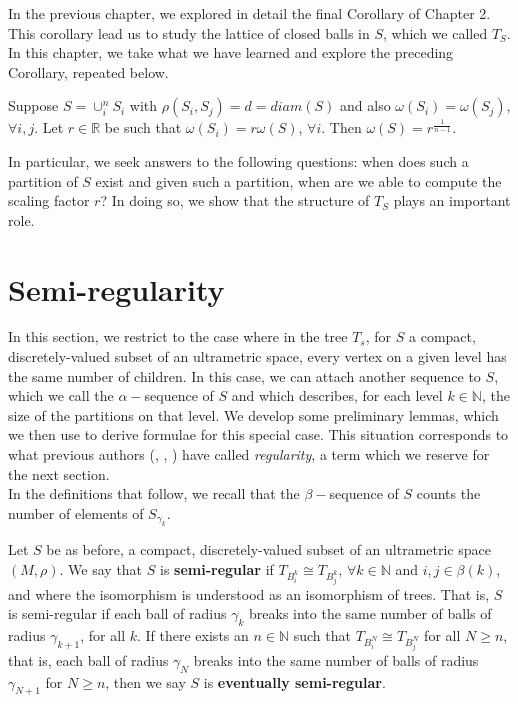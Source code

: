 In the previous chapter, we explored in detail the final Corollary of Chapter 2. This corollary lead us to study the lattice of closed balls in $S$, which we called $T_S$. In this chapter, we take what we have learned and explore the preceding Corollary, repeated below.\\

\begin{corollary*}
	Suppose $S = \cup_i^n S_i$ with $\rho(S_i, S_j)=d=diam(S)$ and also $\omega(S_i)=\omega(S_j)$, $\forall i,j$.  Let $r \in \mathbb{R}$ be such that $\omega(S_i)=r\omega(S)$, $\forall i$. Then $\omega(S) = r^{\frac{1}{n-1}}$. 
\end{corollary*}

In particular, we seek answers to the following questions: when does such a partition of $S$ exist and given such a partition, when are we able to compute the scaling factor $r$? In doing so, we show that the structure of $T_S$ plays an important role. 


\section{Semi-regularity}
In this section, we restrict to the case where in the tree $T_s$, for $S$ a compact, discretely-valued subset of an ultrametric space, every vertex on a given level has the same number of children. In this case, we can attach another sequence to $S$, which we call the $\alpha-$sequence of $S$ and which describes, for each level $k \in \mathbb{N}$, the size of the partitions on that level. We develop some preliminary lemmas, which we then use to derive formulae for this special case. This situation corresponds to what previous authors (\cite{amice}, \cite{cef}, \cite{fp}) have called \textit{regularity}, a term which we reserve for the next section. \\

In the definitions that follow, we recall that the $\beta-$sequence of $S$ counts the number of elements of $S_{\gamma_k}$.\\


\begin{definition}
Let $S$ be as before, a compact, discretely-valued subset of an ultrametric space $(M, \rho)$. We say that $S$ is \textbf{semi-regular} if $T_{B^k_i} \cong T_{B^k_j}$, $\forall k \in \mathbb{N}$ and  $i,j \in \beta(k)$, and where the isomorphism is understood as an isomorphism of trees. That is, $S$ is semi-regular if each ball of radius $\gamma_k$ breaks into the same number of balls of radius $\gamma_{k+1}$, for all $k$. If there exists an $n \in \mathbb{N}$ such that $T_{B^N_i} \cong T_{B^N_j}$ for all $N \geq n$, that is,  each ball of radius $\gamma_N$ breaks into the same number of balls of radius $\gamma_{N+1}$ for $N \geq n$, then we say $S$ is \textbf{eventually semi-regular}.
\end{definition}


